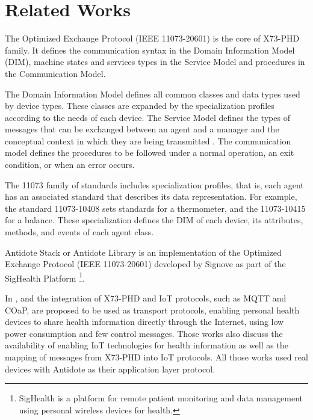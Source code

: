 \section{Related Works}\label{relatedworks}

The Optimized Exchange Protocol (IEEE 11073-20601) is the core of X73-PHD family. It defines the communication syntax in the Domain Information Model (DIM), machine states and services types in the Service Model and procedures in the Communication Model. 

The Domain Information Model defines all common classes and data types used by device types. These classes are expanded by the specialization profiles according to the needs of each device. The Service Model defines the types of messages that can be exchanged between an agent and a manager and the conceptual context in which they are being transmitted \cite{b17}. The communication model defines the procedures to be followed under a normal operation, an exit condition, or when an error occurs.

The 11073 family of standards includes specialization profiles, that is, each agent has an associated standard that describes its data representation. For example, the standard 11073-10408 sets standards for a thermometer, and the 11073-10415 for a balance. These specialization defines the DIM of each device, its attributes, methods, and events of each agent class.

Antidote Stack or Antidote Library is an implementation of the Optimized Exchange Protocol (IEEE 11073-20601) developed by Signove as part of the SigHealth Platform \footnote{SigHealth is a platform for remote patient monitoring and data management using personal wireless devices for health.}. 

In \cite{b7},\cite{b8} and \cite{b9} the integration of X73-PHD and IoT protocols, such as MQTT and COaP, are proposed to be used as transport protocols, enabling personal health devices to share health information directly through the Internet, using low power consumption and few control messages. Those works also discuss the availability of enabling IoT technologies for health information as well as the mapping of messages from X73-PHD into IoT protocols. All those works used real devices with Antidote as their application layer protocol.

